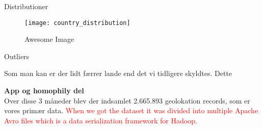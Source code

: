 Distributioner

\begin{figure}[H]
    \centering
    \texttt{[image: country\_distribution]}
    \caption{Awesome Image}
    \label{fig:awesome_image}
\end{figure}
Outliers



Som man kan er der lidt færrer lande end det vi tidligere skyldtes. Dette 


\textbf{App og homophily del}\\


Over disse 3 måneder blev der indsamlet 2.665.893 geolokation records, som er vores primær data. 
\textcolor{red}{When we got the dataset it was divided into multiple Apache Avro files which is a data serialization framework for Hadoop.\cite{apacheavro}}

